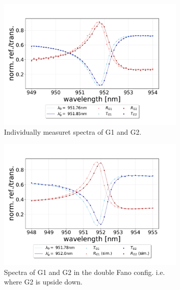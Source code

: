 \begin{figure}[h!]
    \centering
    \begin{subfigure}[b]{0.49\textwidth}
        \includegraphics[width=\textwidth]{figures/results/M3:M5/M3:M5_initial_spectra.pdf}
        \caption{Individually measuret spectra of G1 and G2.}
        \label{}
    \end{subfigure}
    \begin{subfigure}[b]{0.49\textwidth}
        \includegraphics[width=\textwidth]{figures/results/M3:M5/M3:M5_spectra_at_measurement.pdf}
        \caption{Spectra of G1 and G2 in the double Fano config. i.e. where G2 is upside down.}
        \label{}
    \end{subfigure}
    \caption{}
    \label{}
\end{figure}

